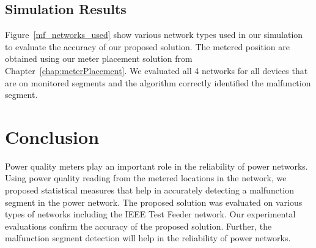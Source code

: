 \subsection{Simulation Results}
Figure~\ref{mf_networks_used} show various network types used in our simulation to evaluate the accuracy of our proposed solution. The metered position are obtained using our meter placement solution from Chapter~\ref{chap:meterPlacement}. We evaluated all 4 networks for all devices that are on monitored segments and the algorithm correctly identified the malfunction segment.

\section{Conclusion}
Power quality meters play an important role in the reliability of power networks. Using power quality reading from the metered locations in the network, we proposed statistical measures that help in accurately detecting a malfunction segment in the power network. The proposed solution was evaluated on various types of networks including the IEEE Test Feeder network. Our experimental evaluations confirm the accuracy of the proposed solution. Further, the malfunction segment detection will help in the reliability of power networks.